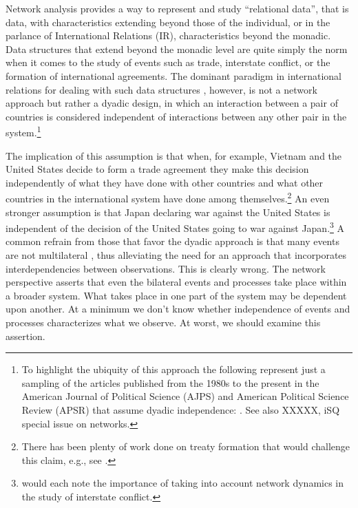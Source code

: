 Network analysis provides a way to represent and study ``relational data'', that is data, with characteristics extending beyond those of the individual, or in the parlance of International Relations (IR), characteristics beyond the monadic. Data structures that extend beyond the monadic level are quite simply the norm when it comes to the study of events such as trade, interstate conflict, or the formation of international agreements. The dominant paradigm in  international relations for dealing with such data structures , however, is not a network approach but rather a dyadic design, in which an interaction between a pair of countries is considered independent of interactions between any other pair in the system.\footnote{To highlight the ubiquity of this approach the following represent just a sampling of the articles published from the 1980s to the present in the American Journal of Political Science (AJPS) and American Political Science Review (APSR) that assume dyadic independence: \citet{dixon:1983,mansfield:etal:2000,lemke:reed:2001a,mitchell:2002,dafoe:2011a,fuhrmann:sechser:2014,carnegie:2014}. See also XXXXX, iSQ special issue on networks.} 

The implication of this assumption is that when, for example, Vietnam and the United States decide to form a trade agreement they make this decision independently of what they have done with other countries and what other countries in the international system have done among themselves.\footnote{There has been plenty of work done on treaty formation that would challenge this claim, e.g., see \citet{manger:etal:2012,kinne:2013}.} An even stronger assumption is that Japan declaring war against the United States is independent of the decision of the United States going to war against Japan.\footnote{\citet{maoz:etal:2006,ward:etal:2007,minhas:etal:2016} would each note the importance of taking into account network dynamics in the study of interstate conflict.} A common refrain from those that favor the dyadic approach is that many events are not multilateral \citep{diehl:wright:2016}, thus alleviating the need for an approach that incorporates interdependencies between observations. This is clearly wrong. The network perspective asserts that even the bilateral events and processes take place within a broader system. What takes place in one part of the system may be dependent upon another. At a minimum we don't know whether independence of events and processes characterizes what we observe. At worst, we should examine this assertion.  

